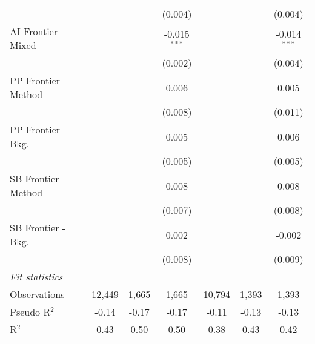 \begin{tabular}{lcccccc}
                        &              &             & (0.004)        &              &         & (0.004)\\   
   AI Frontier - Mixed  &              &             & -0.015$^{***}$ &              &         & -0.014$^{***}$\\   
                        &              &             & (0.002)        &              &         & (0.004)\\   
   PP Frontier - Method &              &             & 0.006          &              &         & 0.005\\   
                        &              &             & (0.008)        &              &         & (0.011)\\   
   PP Frontier - Bkg.   &              &             & 0.005          &              &         & 0.006\\   
                        &              &             & (0.005)        &              &         & (0.005)\\   
   SB Frontier - Method &              &             & 0.008          &              &         & 0.008\\   
                        &              &             & (0.007)        &              &         & (0.008)\\   
   SB Frontier - Bkg.   &              &             & 0.002          &              &         & -0.002\\   
                        &              &             & (0.008)        &              &         & (0.009)\\   
   \midrule
   \emph{Fit statistics}\\
   Observations         & 12,449       & 1,665       & 1,665          & 10,794       & 1,393   & 1,393\\  
   Pseudo R$^2$         & -0.14        & -0.17       & -0.17          & -0.11        & -0.13   & -0.13\\  
   R$^2$                & 0.43         & 0.50        & 0.50           & 0.38         & 0.43    & 0.42\\  
   

\end{tabular}
